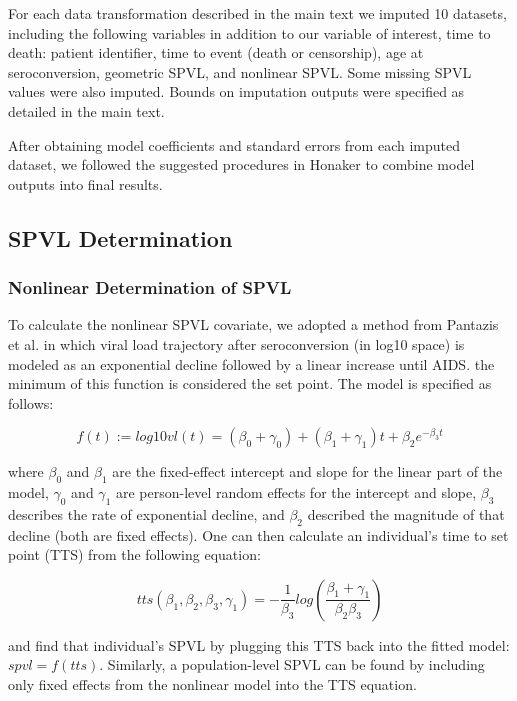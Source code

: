 \documentclass[12pt, titlepage, proquest]{article}
\begin{document}
For each data transformation described in the main text we imputed 10 datasets, including the following variables in addition to our variable of interest, time to death: patient identifier, time to event (death or censorship), age at seroconversion, geometric SPVL, and nonlinear SPVL. Some missing SPVL values were also imputed. Bounds on imputation outputs were specified as detailed in the main text.

After obtaining model coefficients and standard errors from each imputed dataset, we followed the suggested procedures in Honaker \cite{honaker_amelia_2015} to combine model outputs into final results.

\subsection{SPVL Determination}

\subsubsection{Nonlinear Determination of SPVL}

To calculate the nonlinear SPVL covariate, we adopted a method from Pantazis et al. \cite{pantazis_bivariate_2005} in which viral load trajectory after seroconversion (in log10 space) is modeled as an exponential decline followed by a linear increase until AIDS. the minimum of this function is considered the set point. The model is specified as follows: 

\begin{equation}
	f(t) := log10vl(t) = (\beta_{0} + \gamma_{0}) + (\beta_{1}+\gamma_{1})t + \beta_{2}e^{-\beta_{3}t}
\end{equation}

where $\beta_{0}$ and $\beta_{1}$ are the fixed-effect intercept and slope for the linear part of the model, $\gamma_{0}$ and $\gamma_{1}$ are person-level random effects for the intercept and slope, $\beta_{3}$ describes the rate of exponential decline, and $\beta_{2}$ described the magnitude of that decline (both are fixed effects). One can then calculate an individual's time to set point (TTS) from the following equation:

\begin{equation}
tts(\beta_{1}, \beta_{2}, \beta_{3}, \gamma_{1}) = -\frac{1}{\beta_{3}} log\left(\frac{\beta_{1} + \gamma_{1}}{\beta_{2}\beta_{3}}\right)
\end{equation}

and find that individual's SPVL by plugging this TTS back into the fitted model: $spvl=f(tts)$. Similarly, a population-level SPVL can be found by including only fixed effects from the nonlinear model into the TTS equation.
\end{document}
